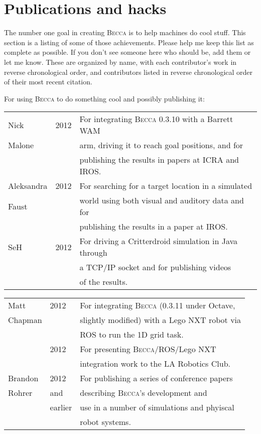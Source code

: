 \chapter{Publications and hacks}

The number one goal in creating \textsc{Becca} is to help machines do cool stuff. This section is a listing of some of those achievements. Please help me keep this list as complete as possible. If you don't see someone here who should be, add them or let me know. These are organized by name, with each contributor's work in reverse chronological order, and contributors listed in reverse chronological order of their most recent citation.

For using \textsc{Becca} to do something cool and possibly publishing it:

\begin{tabular}{|l|l|l|}
\hline
Nick &2012& For integrating \textsc{Becca} 0.3.10 with a Barrett WAM\\
Malone&& arm, driving it to reach goal positions, and for \\
 && publishing the results in papers at ICRA and IROS.\\
\hline
Aleksandra & 2012 & For searching for a target location in a simulated\\
Faust&& world using both visual and auditory data and for\\
&& publishing the results in a paper at IROS.\\
\hline
SeH & 2012 & For driving a Critterdroid simulation in Java through \\
&&a TCP/IP socket and for publishing videos \\
&&of the results. \\
\hline
 \end{tabular}

\begin{tabular}{|l|l|l|}
\hline
Matt & 2012 & For integrating \textsc{Becca} (0.3.11 under Octave,\\
Chapman&& slightly modified) with a Lego NXT robot via \\
&&ROS to run the 1D grid task.\\
& 2012 & For presenting \textsc{Becca}/ROS/Lego NXT \\
&&integration work to the LA Robotics Club.\\
\hline
Brandon & 2012 & For publishing a series of conference papers  \\
Rohrer & and & describing \textsc{Becca}'s development and \\
& earlier & use in a number of simulations and phyiscal \\
&& robot systems.\\
\hline
\end{tabular}


